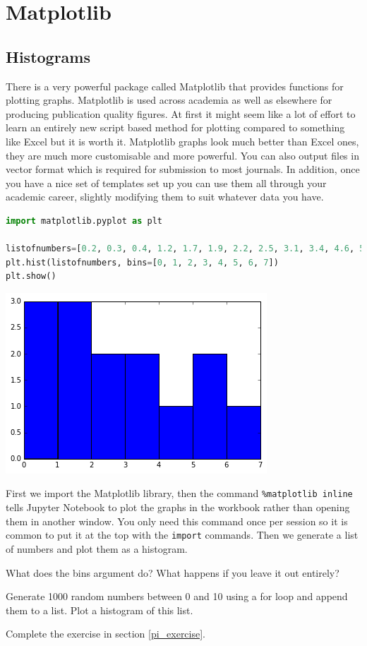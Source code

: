 \section{Matplotlib}\label{matplotlib}
	\subsection{Histograms}
		There is a very powerful package called Matplotlib that provides functions for plotting graphs. Matplotlib is used across academia as well as elsewhere for producing publication quality figures. At first it might seem like a lot of effort to learn an entirely new script based method for plotting compared to something like Excel but it is worth it. Matplotlib graphs look much better than Excel ones, they are much more customisable and more powerful. You can also output files in vector format which is required for submission to most journals. In addition, once you have a nice set of templates set up you can use them all through your academic career, slightly modifying them to suit whatever data you have.
		\begin{lstlisting}[language=Python]
%matplotlib inline
import matplotlib.pyplot as plt

listofnumbers=[0.2, 0.3, 0.4, 1.2, 1.7, 1.9, 2.2, 2.5, 3.1, 3.4, 4.6, 5.1, 5.6, 6.0, 7.4, 7.4, 7.6]
plt.hist(listofnumbers, bins=[0, 1, 2, 3, 4, 5, 6, 7])
plt.show()\end{lstlisting}
		\includegraphics[scale=0.7]{images/histogram}

		First we import the Matplotlib library, then the command \texttt{\%matplotlib inline} tells Jupyter Notebook to plot the graphs in the workbook rather than opening them in another window. You only need this command once per session so it is common to put it at the top with the \texttt{import} commands. Then we generate a list of numbers and plot them as a histogram.
		\begin{task}What does the bins argument do? What happens if you leave it out entirely?\end{task}
		\begin{task}Generate 1000 random numbers between 0 and 10 using a for loop and append them to a list. Plot a histogram of this list.\end{task}
		\begin{task}Complete the exercise in section \ref{pi_exercise}.\end{task}

